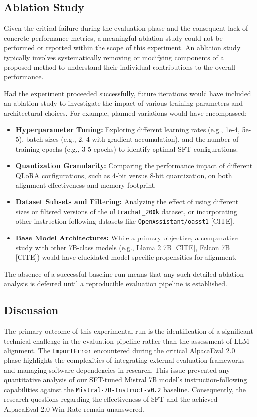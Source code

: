\documentclass[11pt]{article}
\begin{document}
\subsection{Ablation Study}
Given the critical failure during the evaluation phase and the consequent lack of concrete performance metrics, a meaningful ablation study could not be performed or reported within the scope of this experiment. An ablation study typically involves systematically removing or modifying components of a proposed method to understand their individual contributions to the overall performance.

Had the experiment proceeded successfully, future iterations would have included an ablation study to investigate the impact of various training parameters and architectural choices. For example, planned variations would have encompassed:
\begin{itemize}
    \item \textbf{Hyperparameter Tuning:} Exploring different learning rates (e.g., 1e-4, 5e-5), batch sizes (e.g., 2, 4 with gradient accumulation), and the number of training epochs (e.g., 3-5 epochs) to identify optimal SFT configurations.
    \item \textbf{Quantization Granularity:} Comparing the performance impact of different QLoRA configurations, such as 4-bit versus 8-bit quantization, on both alignment effectiveness and memory footprint.
    \item \textbf{Dataset Subsets and Filtering:} Analyzing the effect of using different sizes or filtered versions of the \texttt{ultrachat\_200k} dataset, or incorporating other instruction-following datasets like \texttt{OpenAssistant/oasst1} [CITE].
    \item \textbf{Base Model Architectures:} While a primary objective, a comparative study with other 7B-class models (e.g., Llama 2 7B [CITE], Falcon 7B [CITE]) would have elucidated model-specific propensities for alignment.
\end{itemize}
The absence of a successful baseline run means that any such detailed ablation analysis is deferred until a reproducible evaluation pipeline is established.

\subsection{Discussion}
The primary outcome of this experimental run is the identification of a significant technical challenge in the evaluation pipeline rather than the assessment of LLM alignment. The \texttt{ImportError} encountered during the critical AlpacaEval 2.0 phase highlights the complexities of integrating external evaluation frameworks and managing software dependencies in research. This issue prevented any quantitative analysis of our SFT-tuned Mistral 7B model's instruction-following capabilities against the \texttt{Mistral-7B-Instruct-v0.2} baseline. Consequently, the research questions regarding the effectiveness of SFT and the achieved AlpacaEval 2.0 Win Rate remain unanswered.
\end{document}
